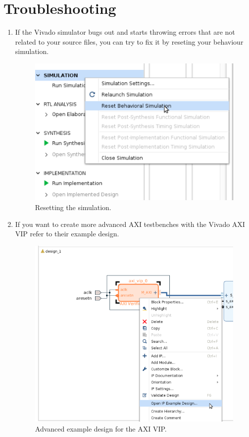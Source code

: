 \documentclass[11pt]{article}
\begin{document}
\section*{Troubleshooting}
\begin{enumerate}
\item If the Vivado simulator bugs out and starts throwing errors that are not related to your source files, you can try to fix it by reseting your behaviour simulation.
		\begin{figure}[H]
		  \centering
		  \includegraphics[scale=0.5]{troubleshoot1.png}
		  \caption{Resetting the simulation.}
		  \label{fig:roubleshoot1}
		\end{figure} 
\item If you want to create more advanced AXI testbenches with the Vivado AXI VIP refer to their example design.
		\begin{figure}[H]
		  \centering
		  \includegraphics[scale=0.5]{exdesign.png}
		  \caption{Advanced example design for the AXI VIP.}
		  \label{fig:exdesign}
		\end{figure} 
\end{enumerate}
\end{document}
